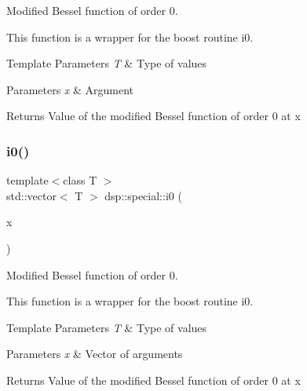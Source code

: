 Modified Bessel function of order 0. 

This function is a wrapper for the boost routine i0. 
\begin{DoxyTemplParams}{Template Parameters}
{\em T} & Type of values \\
\hline
\end{DoxyTemplParams}

\begin{DoxyParams}{Parameters}
{\em x} & Argument \\
\hline
\end{DoxyParams}
\begin{DoxyReturn}{Returns}
Value of the modified Bessel function of order 0 at x 
\end{DoxyReturn}
\mbox{\label{namespacedsp_1_1special_a4e440dd48c22a2496a51c6473a3fc09e}} 
\subsubsection{\texorpdfstring{i0()}{i0()}\hspace{0.1cm}{\footnotesize\ttfamily [2/2]}}
{\footnotesize\ttfamily template$<$class T $>$ \\
std\+::vector$<$ T $>$ dsp\+::special\+::i0 (\begin{DoxyParamCaption}\item[{std\+::vector$<$ T $>$}]{x }\end{DoxyParamCaption})}



Modified Bessel function of order 0. 

This function is a wrapper for the boost routine i0. 
\begin{DoxyTemplParams}{Template Parameters}
{\em T} & Type of values \\
\hline
\end{DoxyTemplParams}

\begin{DoxyParams}{Parameters}
{\em x} & Vector of arguments \\
\hline
\end{DoxyParams}
\begin{DoxyReturn}{Returns}
Value of the modified Bessel function of order 0 at x 
\end{DoxyReturn}
